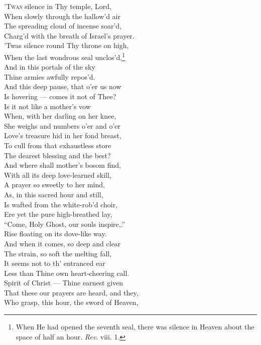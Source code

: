 ’\textsc{Twas} silence in Thy temple, Lord, \\
 When slowly through the hallow’d air \\
 The spreading cloud of incense soar’d, \\
 Charg’d with the breath of Israel’s prayer. \\
  ’Twas silence round Thy throne on high, \\
 When the last wondrous seal unclos’d,\footnote{When He had opened the seventh seal, there was silence in Heaven about the space of half an hour. \emph{Rev}. viii. 1.} \\
 And in this portals of the sky \\
 Thine armies awfully repos’d. \\
  And this deep pause, that o’er us now \\
 Is hovering — comes it not of Thee? \\
 Is it not like a mother’s vow \\
 When, with her darling on her knee, \\
  She weighs and numbers o’er and o’er \\
 Love’s treasure hid in her fond breast, \\
 To cull from that exhaustless store \\
 The dearest blessing and the best? \\
  And where shall mother’s bosom find, \\
 With all its deep love-learned skill, \\
 A prayer so sweetly to her mind, \\
 As, in this sacred hour and still, \\
  Is wafted from the white-rob’d choir, \\
 Ere yet the pure high-breathed lay, \\
 “Come, Holy Ghost, our souls inspire,.” \\
 Rise floating on its dove-like way. \\
  And when it comes, so deep and clear \\
 The strain, so soft the melting fall, \\
 It seems not to th’ entranced ear \\
 Less than Thine own heart-cheering call. \\
  Spirit of Christ — Thine earnest given \\
 That these our prayers are heard, and they, \\
 Who grasp, this hour, the sword of Heaven, \\

